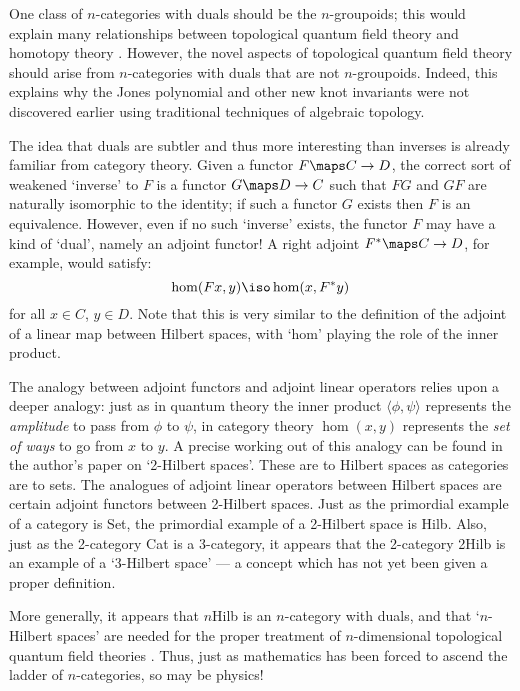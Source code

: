 One class of $n$-categories with duals should be the $n$-groupoids; this
would explain many relationships between topological quantum field
theory and homotopy theory \cite{Porter}.  However, the novel aspects of
topological quantum field theory should arise from $n$-categories with
duals that are not $n$-groupoids.  Indeed, this explains why the Jones
polynomial and other new knot invariants were not discovered earlier
using traditional techniques of algebraic topology.

The idea that duals are subtler and thus more interesting than inverses
is already familiar from category theory.  Given a functor $F
\maps C \to D$, the correct sort of weakened `inverse' to $F$ is a 
functor $G \maps D \to C$ such that $FG$ and $GF$ are naturally
isomorphic to the identity; if such a functor $G$ exists then $F$ is an
equivalence.  However, even if no such `inverse' exists, the functor $F$
may have a kind of `dual', namely an adjoint functor!  A right adjoint
$F^\ast \maps C \to D$, for example, would satisfy:
\[    \hom(Fx,y) \iso \hom(x,F^\ast y) \]
for all $x \in C$, $y \in D$.  Note that this is very similar to the
definition of the adjoint of a linear map between Hilbert spaces, with
`hom' playing the role of the inner product.  

The analogy between adjoint functors and adjoint linear operators relies
upon a deeper analogy: just as in quantum theory the inner product
$\langle \phi,\psi\rangle$ represents the {\it amplitude} to pass from
$\phi$ to $\psi$, in category theory $\hom(x,y)$ represents the {\it set
of ways} to go from $x$ to $y$.  A precise working out of this analogy
can be found in the author's paper \cite{B} on `2-Hilbert spaces'.
These are to Hilbert spaces as categories are to sets.  The analogues of 
adjoint linear operators between Hilbert spaces are certain adjoint
functors between 2-Hilbert spaces.  Just as the primordial example of a
category is Set, the primordial example of a 2-Hilbert space is Hilb.
Also, just as the 2-category Cat is a 3-category, it appears that the
2-category 2Hilb is an example of a `3-Hilbert space' --- a concept
which has not yet been given a proper definition.  

More generally, it appears that $n$Hilb is an $n$-category with duals,
and that `$n$-Hilbert spaces' are needed for the proper treatment of
$n$-dimensional topological quantum field theories \cite{BD,Freed}.
Thus, just as mathematics has been forced to ascend the ladder of
$n$-categories, so may be physics!

